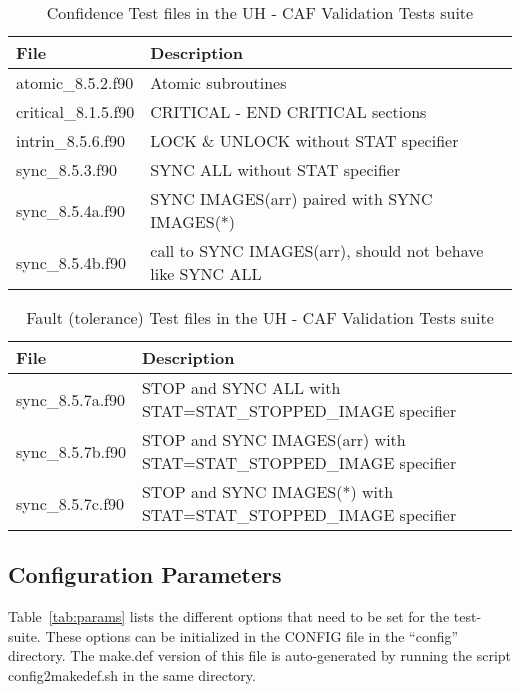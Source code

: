 \begin{table}[h]
\caption{Confidence Test files in the UH - CAF Validation Tests suite}
\label{tab:confidence_files}
\begin{tabular}{|l|p{8cm}|}
\hline
File & Description \\ \hline
atomic\_8.5.2.f90 & Atomic subroutines\\ \hline
critical\_8.1.5.f90 & CRITICAL - END CRITICAL sections\\ \hline
intrin\_8.5.6.f90  & LOCK \& UNLOCK without STAT specifier\\ \hline
sync\_8.5.3.f90  & SYNC ALL without STAT specifier\\ \hline
sync\_8.5.4a.f90 & SYNC IMAGES(arr) paired with SYNC IMAGES(*)\\ \hline
sync\_8.5.4b.f90 & call to SYNC IMAGES(arr), should not behave like SYNC ALL\\ \hline
\hline
\end{tabular}
\end{table}

\begin{table}[h]
\caption{Fault (tolerance) Test files in the UH - CAF Validation Tests suite}
\label{tab:fault_files}
\begin{tabular}{|l|p{8cm}|}
\hline
File & Description \\ \hline
sync\_8.5.7a.f90 & STOP and SYNC ALL with STAT=STAT\_STOPPED\_IMAGE specifier\\ \hline
sync\_8.5.7b.f90 & STOP and SYNC IMAGES(arr) with STAT=STAT\_STOPPED\_IMAGE specifier\\ \hline
sync\_8.5.7c.f90 &  STOP and SYNC IMAGES(*) with STAT=STAT\_STOPPED\_IMAGE specifier\\ \hline
\end{tabular}
\end{table}

\subsection{Configuration Parameters}
Table~\ref{tab:params} lists the different options that need to be
set for the test-suite. These options can be initialized in the
CONFIG file in the ``config'' directory. The make.def version of
this file is auto-generated by running the script
config2makedef.sh in the same directory.

